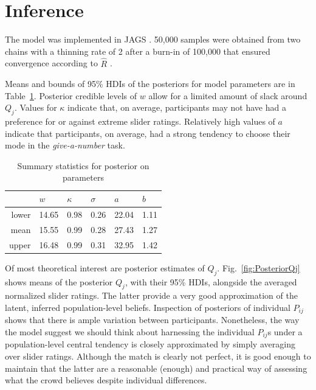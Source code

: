 \documentclass[10pt,letterpaper]{article}
\newcommand{\figref}[1]{Fig.~\ref{#1}}
\begin{document}
\section{Inference}

The model was implemented in JAGS \cite{Plummer2003:JAGS:-A-Program}. 50,000 samples were
obtained from two chains with a thinning rate of 2 after a burn-in of 100,000 that ensured
convergence according to $\hat{R}$ \cite{GelmanRubin1992:Inference-from-}.

Means and bounds of 95\% HDIs of the posteriors for model parameters are in
Table~\ref{tab:SummaryStats}. Posterior credible levels of $w$ allow for a limited amount of
slack around $Q_j$. Values for $\kappa$ indicate that, on average, participants may not have had a
preference for or against extreme slider ratings. Relatively high values of $a$ indicate that
participants, on average, had a strong tendency to choose their mode in the \emph{give-a-number}
task.
\begin{table}[ht]
\centering
\begin{tabular}{rlllll}
 & $w$ & $\kappa$ & $\sigma$ & $a$ & $b$ \\ \hline
  lower & 14.65 &  0.98 &  0.26 & 22.04 &  1.11 \\ 
  mean & 15.55 &  0.99 &  0.28 & 27.43 &  1.27 \\ 
  upper & 16.48 &  0.99 &  0.31 & 32.95 &  1.42 \\ 
   \hline
\end{tabular}
\caption{Summary statistics for posterior on parameters}
\label{tab:SummaryStats}
\end{table}

Of most theoretical interest are posterior estimates of $Q_j$. \figref{fig:PosteriorQj}
shows means of the posterior $Q_j$, with their 95\% HDIs, alongside the averaged normalized
slider ratings. The latter provide a very good approximation of the latent, inferred
population-level beliefs. Inspection of posteriors of individual $P_{ij}$ shows that there is
ample variation between participants. Nonetheless, the way the model suggest we should think about
harnessing the individual $P_{ij}$s under a population-level central tendency is closely
approximated by simply averaging over slider ratings. Although the match is clearly not
perfect, it is good enough to maintain that the latter are a reasonable (enough) and practical
way of assessing what the crowd believes despite individual differences.
\end{document}
